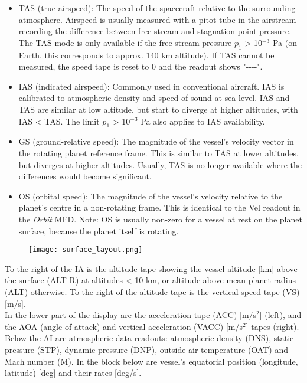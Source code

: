 \documentclass[Orbiter User Manual.tex]{subfiles}
\begin{document}
\begin{itemize}
\item TAS (true airspeed): The speed of the spacecraft relative to the surrounding atmosphere. Airspeed is usually measured with a pitot tube in the airstream recording the difference between free-stream and stagnation point pressure. The TAS mode is only available if the free-stream pressure $p_{1}$ > 10$^{-3}$ Pa (on Earth, this corresponds to approx. 140 km altitude). If TAS cannot be measured, the speed tape is reset to 0 and the readout shows "-{}-{}-{}-".
\item IAS (indicated airspeed): Commonly used in conventional aircraft. IAS is calibrated to atmospheric density and speed of sound at sea level. IAS and TAS are similar at low altitude, but start to diverge at higher altitudes, with IAS < TAS. The limit $p_{1}$ > 10$^{-3}$ Pa also applies to IAS availability.
\item GS (ground-relative speed): The magnitude of the vessel's velocity vector in the rotating planet reference frame. This is similar to TAS at lower altitudes, but diverges at higher altitudes. Usually, TAS is no longer available where the differences would become significant.
\item OS (orbital speed): The magnitude of the vessel's velocity relative to the planet's centre in a non-rotating frame. This is identical to the Vel readout in the \textit{Orbit} MFD. Note: OS is usually non-zero for a vessel at rest on the planet surface, because the planet itself is rotating.
\end{itemize}

\begin{figure}[H]
  \centering
  \texttt{[image: surface\_layout.png]}
\end{figure}

\noindent
To the right of the IA is the altitude tape showing the vessel altitude [km] above the surface (ALT-R) at altitudes < 10 km, or altitude above mean planet radius (ALT) otherwise. To the right of the altitude tape is the vertical speed tape (VS) [m/s].\\
In the lower part of the display are the acceleration tape (ACC) [m/s$^{2}$] (left), and the AOA (angle of attack) and vertical acceleration (VACC) [m/s$^{2}$] tapes (right).\\
Below the AI are atmospheric data readouts: atmospheric density (DNS), static pressure (STP), dynamic pressure (DNP), outside air temperature (OAT) and Mach number (M). In the block below are vessel's equatorial position (longitude, latitude) [deg] and their rates [deg/s].
\end{document}
